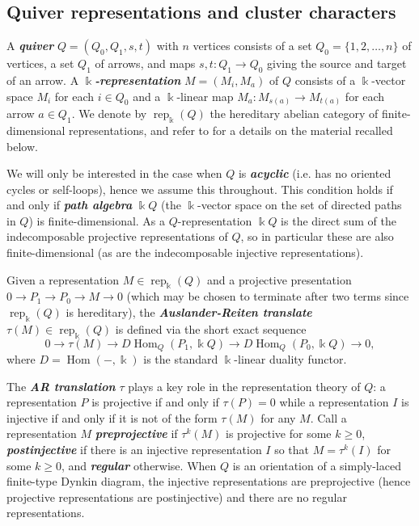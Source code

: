 \documentclass[12pt]{amsart}
\newcommand{\newword}[1]{\textbf{\emph{#1}}}
\newcommand{\kk}{\Bbbk}
\newcommand{\rep}{\operatorname{rep}}
\DeclareMathOperator{\Hom}{Hom}
\theoremstyle{remark}
\numberwithin{equation}{section}
\numberwithin{figure}{section}
\begin{document}
\subsection{Quiver representations and cluster characters}
\label{sec:quiverbackground}
A \newword{quiver} $Q=(Q_0,Q_1,s,t)$ with $n$ vertices consists of a set $Q_0=\{1,2,\ldots,n\}$ of vertices, a set $Q_1$ of arrows, and maps $s,t:Q_1\to Q_0$ giving the source and target of an arrow.
A \newword{$\kk$-representation} $M=(M_i,M_a)$ of $Q$ consists of a $\kk$-vector space $M_i$ for each $i\in Q_0$ and a $\kk$-linear map $M_a:M_{s(a)}\to M_{t(a)}$ for each arrow $a\in Q_1$.
We denote by $\rep_\kk(Q)$ the hereditary abelian category of finite-dimensional representations, and refer to \cite{ASS06} for a details on the material recalled below.

We will only be interested in the case when $Q$ is \newword{acyclic} (i.e. has no oriented cycles or self-loops), hence we assume this throughout.
This condition holds if and only if \newword{path algebra} $\kk Q$ (the $\kk$-vector space on the set of directed paths in $Q$) is finite-dimensional.
As a $Q$-representation $\kk Q$ is the direct sum of the indecomposable projective representations of $Q$, so in particular these are also finite-dimensional (as are the indecomposable injective representations).

Given a representation $M\in\rep_\kk(Q)$ and a projective presentation $0\to P_1\to P_0\to M\to 0$ (which may be chosen to terminate after two terms since $\rep_\kk(Q)$ is hereditary), the \newword{Auslander-Reiten translate} $\tau(M)\in\rep_\kk(Q)$ is defined via the short exact sequence
\begin{equation}
  \label{eq:AR translation}
  0\longrightarrow \tau(M)\longrightarrow D\Hom_Q(P_1,\kk Q)\longrightarrow D\Hom_Q(P_0,\kk Q)\longrightarrow 0,
\end{equation}
where $D=\Hom(-,\kk)$ is the standard $\kk$-linear duality functor.

The \newword{AR translation} $\tau$ plays a key role in the representation theory of $Q$: a representation $P$ is projective if and only if $\tau(P)=0$ while a representation $I$ is injective if and only if it is not of the form $\tau(M)$ for any $M$.
Call a representation $M$ \newword{preprojective} if $\tau^k(M)$ is projective for some $k\ge0$, \newword{postinjective} if there is an injective representation $I$ so that $M=\tau^k(I)$ for some $k\ge0$, and \newword{regular} otherwise.
When $Q$ is an orientation of a simply-laced finite-type Dynkin diagram, the injective representations are preprojective (hence projective representations are postinjective) and there are no regular representations.
\end{document}
